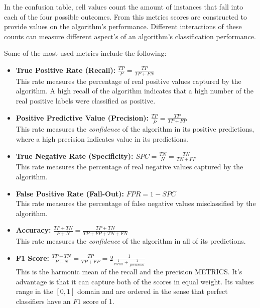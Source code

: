 In the confusion table, cell values count the amount of instances that fall into each of the four possible outcomes. From this metrics scores are constructed to provide values on the algorithm's performance. Different interactions of these counts can measure different aspect's of an algorithm's classification performance.


Some of the most used metrics include the following:

\begin{itemize}
\item \textbf{True Positive Rate (Recall):} $\frac{TP}{P} = \frac{TP}{TP + FN}$ \\ This rate measures the percentage of real positive values captured by the algorithm. A high recall of the algorithm indicates that a high number of the real positive labels were classified as positive.


\item \textbf{Positive Predictive Value (Precision):} $\frac{TP}{\hat{P}} = \frac{TP}{TP + FP}$ \\ This rate measures the \textit{confidence} of the algorithm in its positive predictions, where a high precision indicates value in its predictions.

\item \textbf{True Negative Rate (Specificity):} $ SPC = \frac{TN}{N} = \frac{TN}{TN + FP}$ \\ This rate measures the percentage of real negative values captured by the algorithm.


\item \textbf{False Positive Rate (Fall-Out):} $FPR = 1 - SPC$ \\ This rate measures the percentage of false negative values misclassified by the algorithm.

\item \textbf{Accuracy:} $\frac{TP + TN}{P + N} = \frac{TP + TN}{TP + FP + TN + FN}$ \\ This rate measures the \textit{confidence} of the algorithm in all of its predictions.

%
\item \textbf{F1 Score:} $\frac{TP + TN}{P + N} = \frac{TP}{TP + FP} = 2 \frac{1}{ \frac{1}{recall} + \frac{1}{precision} }$ \\ This is the harmonic mean of the recall and the precision METRICS. It's advantage is that it can capture both of the scores in equal weight. Its values range in the $[0,1 ]$ domain and are ordered in the sense that perfect classifiers have an $F1$ score of 1.


\end{itemize}

